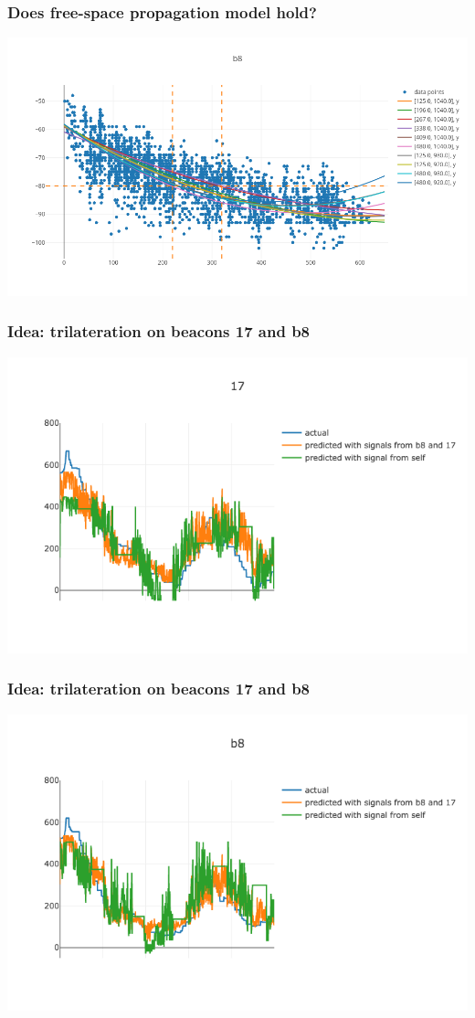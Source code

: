 \documentclass{beamer}
\begin{document}
\begin{frame}
\frametitle{Does free-space propagation model hold?}
\includegraphics[width=\linewidth]{images/different_directions.png}
\end{frame}

\begin{frame}
\frametitle{Idea: trilateration on beacons 17 and b8}
\includegraphics[width=\linewidth]{images/dist_f_rssi_17.png}
\end{frame}

\begin{frame}
\frametitle{Idea: trilateration on beacons 17 and b8}
\includegraphics[width=\linewidth]{images/dist_f_rssi_b8.png}
\end{frame}
\end{document}
